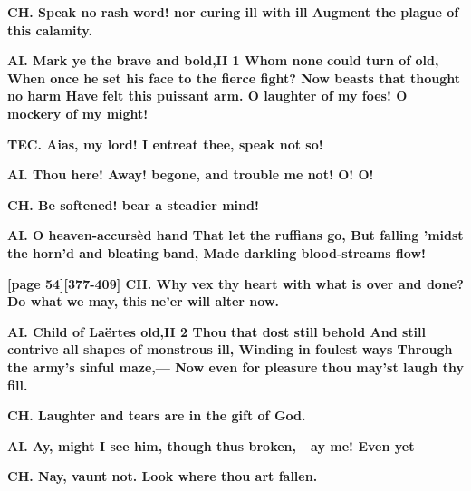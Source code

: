 \documentclass[11pt,letter]{book}
\begin{document}
\par \textbf{CH. Speak no rash word! nor curing ill with ill Augment the plague of this calamity.}
\par 

\par \textbf{AI. Mark ye the brave and bold,II 1 Whom none could turn of old, When once he set his face to the fierce fight? Now beasts that thought no harm Have felt this puissant arm. O laughter of my foes! O mockery of my might!}
\par 

\par \textbf{TEC. Aias, my lord! I entreat thee, speak not so!}
\par 

\par \textbf{AI. Thou here! Away! begone, and trouble me not! O! O!}
\par 

\par \textbf{CH. Be softened! bear a steadier mind!}
\par 

\par \textbf{AI. O heaven-accursèd hand That let the ruffians go, But falling ’midst the horn’d and bleating band, Made darkling blood-streams flow!}
\par 

\par \textbf{[page 54][377-409] CH. Why vex thy heart with what is over and done? Do what we may, this ne’er will alter now.}
\par 

\par \textbf{AI. Child of Laërtes old,II 2 Thou that dost still behold And still contrive all shapes of monstrous ill, Winding in foulest ways Through the army’s sinful maze,— Now even for pleasure thou may’st laugh thy fill.}
\par 

\par \textbf{CH. Laughter and tears are in the gift of God.}
\par 

\par \textbf{AI. Ay, might I see him, though thus broken,—ay me! Even yet—}
\par 

\par \textbf{CH. Nay, vaunt not. Look where thou art fallen.}
\par 
\end{document}
